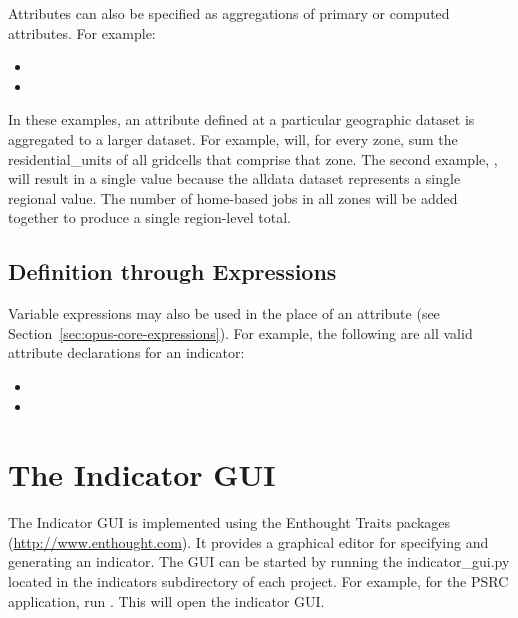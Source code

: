 Attributes can also be specified as aggregations of primary or computed
attributes. For example:

\begin{itemize}
\tight
\item {}
\item {}
\end{itemize}

In these examples, an attribute defined at a particular geographic dataset is
aggregated to a larger dataset. For example,
 will, for
every zone, sum the residential_units of all gridcells that comprise that zone. 
The second example,
, will
result in a single value because the alldata dataset represents a single
regional value. The number of home-based jobs in all zones will be added
together to produce a single region-level total. 

\subsection{Definition through Expressions}

Variable expressions may also be used in the place of an attribute 
(see Section~\ref{sec:opus-core-expressions}). For example, the following are
all valid attribute declarations for an indicator: 

\begin{itemize}
\tight
\item {}
\item {}
\end{itemize}

\section{The Indicator GUI}
\label{sec:indicator-configuration-gui}

The Indicator GUI is implemented using the Enthought Traits packages
(\url{http://www.enthought.com}).  It provides a graphical editor for
specifying and generating an indicator.  The GUI can be started by running
the indicator_gui.py located in the indicators subdirectory of each
project. For example, for the PSRC application, run
.  This will open the indicator GUI.

